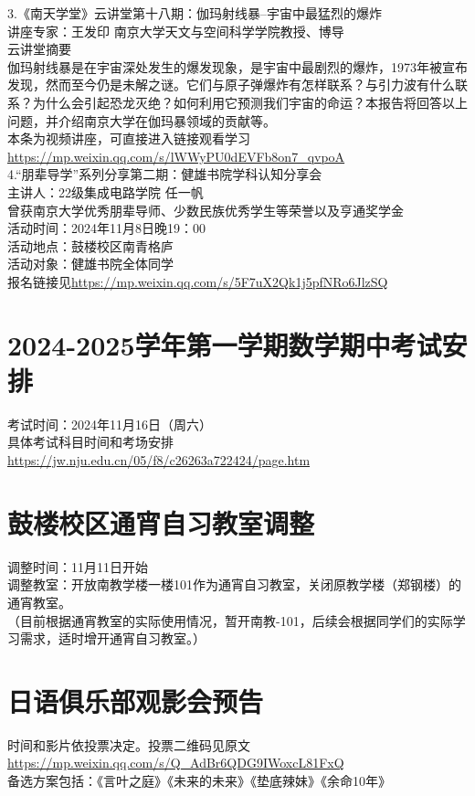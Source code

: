 \documentclass[letterpaper, 12pt]{article}
\begin{document}
\begin{multicols}{2}
3.《南天学堂》云讲堂第十八期：伽玛射线暴--宇宙中最猛烈的爆炸\\
讲座专家：王发印 南京大学天文与空间科学学院教授、博导\\
云讲堂摘要\\       
伽玛射线暴是在宇宙深处发生的爆发现象，是宇宙中最剧烈的爆炸，1973年被宣布发现，然而至今仍是未解之谜。它们与原子弹爆炸有怎样联系？与引力波有什么联系？为什么会引起恐龙灭绝？如何利用它预测我们宇宙的命运？本报告将回答以上问题，并介绍南京大学在伽玛暴领域的贡献等。\\
本条为视频讲座，可直接进入链接观看学习\url{https://mp.weixin.qq.com/s/lWWyPU0dEVFb8on7_qvpoA}\\
4.“朋辈导学”系列分享第二期：健雄书院学科认知分享会\\
主讲人：22级集成电路学院 任一帆\\
曾获南京大学优秀朋辈导师、少数民族优秀学生等荣誉以及亨通奖学金\\
活动时间：2024年11月8日晚19：00\\
活动地点：鼓楼校区南青格庐\\
活动对象：健雄书院全体同学\\
报名链接见\url{https://mp.weixin.qq.com/s/5F7uX2Qk1j5pfNRo6JlzSQ}

\section{2024-2025学年第一学期数学期中考试安排}
考试时间：2024年11月16日（周六）\\
具体考试科目时间和考场安排\url{https://jw.nju.edu.cn/05/f8/c26263a722424/page.htm}\\

\section{鼓楼校区通宵自习教室调整}
调整时间：11月11日开始\\
调整教室：开放南教学楼一楼101作为通宵自习教室，关闭原教学楼（郑钢楼）的通宵教室。\\
（目前根据通宵教室的实际使用情况，暂开南教-101，后续会根据同学们的实际学习需求，适时增开通宵自习教室。）\\

\section{日语俱乐部观影会预告}
时间和影片依投票决定。投票二维码见原文\url{https://mp.weixin.qq.com/s/Q_AdBr6QDG9IWoxcL81FxQ}\\
备选方案包括：《言叶之庭》《未来的未来》《垫底辣妹》《余命10年》


\end{multicols}
\end{document}
